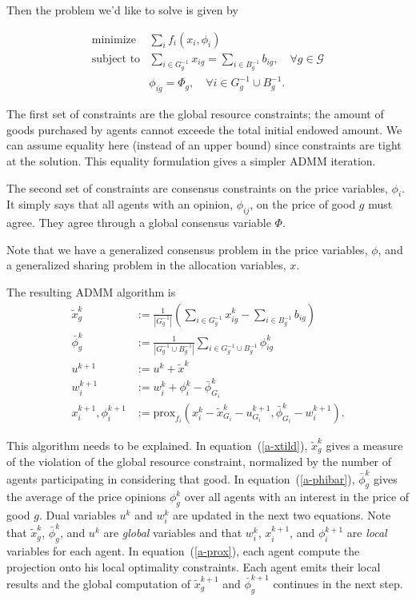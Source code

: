 \documentclass{article}
\begin{document}
Then the problem we'd like to solve is given by

\[
\begin{array}{ll}
\mbox{minimize} & \sum_i f_i(x_i, \phi_i) \\
\mbox{subject to} & \sum\limits_{i \in G^{-1}_g} x_{ig} = \sum\limits_{i \in B^{-1}_g} b_{ig},\quad \forall g \in \mathcal{G}\\
& \phi_{ig} = \Phi_g,\quad \forall i \in G^{-1}_g \cup B^{-1}_g.
\end{array}
\]

The first set of constraints are the global resource constraints; the amount of
goods purchased by agents cannot exceede the total initial endowed amount.
We can assume equality here (instead of an upper bound)
since constraints are tight at the solution. This equality formulation gives
a simpler ADMM iteration.

The second set of constraints are consensus constraints on the price variables,
$\phi_i$. It simply says that all agents with an opinion, $\phi_{ij}$, on the price
of good $g$ must agree. They agree through a global consensus variable $\Phi$.

Note that we have a generalized consensus problem in the price variables,
$\phi$, and a generalized sharing problem in the allocation variables, $x$.

The resulting ADMM algorithm is 
\begin{align}
\label{a-xtild}
\tilde{x}^k_g &:= \frac{1}{|G^{-1}_g|} \left( \sum_{i \in G^{-1}_g} x^k_{ig} - \sum_{i \in B^{-1}_g} b_{ig}\right)\\
\label{a-phibar}
\bar{\phi}^k_g &:= \frac{1}{ |G^{-1}_g \cup B^{-1}_g| } \sum_{i \in G^{-1}_g \cup B^{-1}_g}\phi^k_{ig}\\
u^{k+1} &:= u^k + \tilde{x}^k\\
w_i^{k+1} &:= w_i^k + \phi^k_i - \bar{\phi}^k_{G_i}\\
\label{a-prox}
x_i^{k+1}, \phi_i^{k+1} &:= \mbox{prox}_{f_i}(x_i^k - \tilde{x}^k_{G_i} - u^{k+1}_{G_i},
\bar{\phi}^k_{G_i} - w_i^{k+1}).
\end{align}

This algorithm needs to be explained.
In equation~(\ref{a-xtild}), $\tilde{x}^k_g$ gives a measure of the violation of
the global resource constraint, normalized by the number of agents participating
in considering that good.
In equation~(\ref{a-phibar}), $\bar{\phi}^k_g$ gives the average of the price
opinions $\phi^k_g$ over all agents with an interest in the price of good $g$.
Dual variables $u^k$ and $w^k_i$ are updated in the next two equations.
Note that $\tilde{x}^k_g$, $\bar{\phi}^k_g$, and $u^k$ are \emph{global} variables
and that $w_i^k$, $x_i^{k+1}$, and $\phi_i^{k+1}$ are \emph{local} variables
for each agent. In equation~(\ref{a-prox}), each agent compute the projection
onto his local optimality constraints. Each agent emits their local results and the
global computation of $\tilde{x}^{k+1}_g$ and $\bar{\phi}^{k+1}_g$ continues in the next
step.
\end{document}
